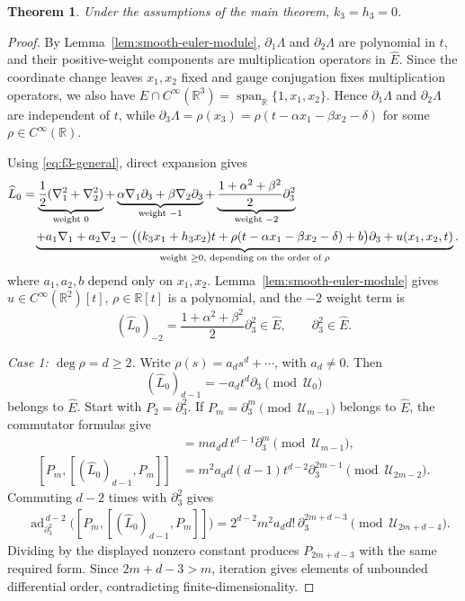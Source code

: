 \documentclass{tCON2e}
\newenvironment{revision}{\begingroup\color{black}}{\endgroup}
\numberwithin{equation}{section}
\theoremstyle{journalplain}
\newtheorem{theorem}{Theorem}[section]
\theoremstyle{journaldef}
\newenvironment{revision}{}{}
\begin{document}
\begin{revision}
\begin{theorem}\label{thm:sector-I-smooth}
Under the assumptions of the main theorem, $k_3=h_3=0$.
\end{theorem}

\begin{proof}
By Lemma~\ref{lem:smooth-euler-module},
$\partial_1\Lambda$ and $\partial_2\Lambda$ are polynomial
in $t$, and their positive-weight components are
multiplication operators in $\widehat E$.
Since the coordinate change leaves $x_1,x_2$ fixed and
gauge conjugation fixes multiplication operators, we also have
$
\widehat E\cap C^\infty(\mathbb R^3)
=\operatorname{span}_{\mathbb R}\{1,x_1,x_2\}.$
Hence $\partial_1\Lambda$ and $\partial_2\Lambda$ are
independent of $t$, while
$
\partial_3\Lambda=\rho(x_3)
=\rho(t-\alpha x_1-\beta x_2-\delta)
$
for some $\rho\in C^\infty(\mathbb R)$.

Using \eqref{eq:f3-general}, direct expansion gives
\begin{align}
\widehat L_0
&=
\underbrace{\frac12(\nabla_1^2+\nabla_2^2)}_{\text{weight }0}
+
\underbrace{\alpha\nabla_1\partial_3
+\beta\nabla_2\partial_3}_{\text{weight }-1}
+
\underbrace{\frac{1+\alpha^2+\beta^2}{2}\partial_3^2}_{\text{weight }-2}
\notag\\
&\quad
\underbrace{+a_1\nabla_1+a_2\nabla_2
-\bigl((k_3x_1+h_3x_2)t
+\rho(t-\alpha x_1-\beta x_2-\delta)+b\bigr)\partial_3
+u(x_1,x_2,t)}_{\text{weight }\ge 0,\text{ depending on the order of } \rho}.
\label{eq:Lhat-short}
\end{align}
where $a_1,a_2,b$ depend only on $x_1,x_2$.
Lemma~\ref{lem:smooth-euler-module} gives
$u\in C^\infty(\mathbb R^2)[t]$, $\rho\in\mathbb R[t]$ is a polynomial, and
the $-2$ weight term is
\[
(\widehat L_0)_{-2}
=\frac{1+\alpha^2+\beta^2}{2}\partial_3^2\in\widehat E,
\qquad
\partial_3^2\in\widehat E.
\]

\emph{Case 1: $\deg\rho=d\ge2$.}
Write $\rho(s)=a_ds^d+\cdots$, with $a_d\ne0$.
Then
\[
(\widehat L_0)_{d-1}
=-a_dt^d\partial_3\pmod{\mathcal U_0}
\]
belongs to $\widehat E$.
Start with $P_2=\partial_3^2$. If
$P_m=\partial_3^m\pmod{\mathcal U_{m-1}}$ belongs to
$\widehat E$, the commutator formulas give
\begin{align*}
[(\widehat L_0)_{d-1},P_m]
&=m a_d d\,t^{d-1}\partial_3^m
\pmod{\mathcal U_{m-1}},\\
[P_m,[(\widehat L_0)_{d-1},P_m]]
&=m^2 a_d d(d-1)t^{d-2}\partial_3^{2m-1}
\pmod{\mathcal U_{2m-2}}.
\end{align*}
Commuting $d-2$ times with $\partial_3^2$ gives
\[
\begin{aligned}
&\operatorname{ad}_{\partial_3^2}^{\,d-2}
\bigl([P_m,[(\widehat L_0)_{d-1},P_m]]\bigr)
=2^{d-2}m^2 a_d d!\,\partial_3^{2m+d-3}
\pmod{\mathcal U_{2m+d-4}}.
\end{aligned}
\]
Dividing by the displayed nonzero constant produces
$P_{2m+d-3}$ with the same required form.
Since $2m+d-3>m$, iteration gives elements of unbounded
differential order, contradicting finite-dimensionality.


\end{proof}
\end{revision}
\end{document}
